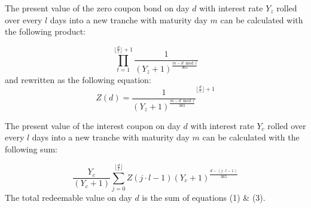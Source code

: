 \documentclass[10pt,oneside,reqno]{minimal}
\begin{document}
\begin{flushleft}
The present value of the zero coupon bond on day $d$ with interest rate $Y_{z}$ rolled over every $l$ days into a new tranche with maturity day $m$ can be calculated with the following product:
\end{flushleft}
  \begin{equation}
\prod_{t=1}^{\lfloor{\frac{d}{l}}\rfloor+1}\frac{1}{(Y_{z}+1)^{\frac{m-d\bmod l}{365}}}
  \end{equation}
and rewritten as the following equation:
  \begin{equation}
  Z\left(d\right)=\frac{1}{\left(Y_{z}+1\right)^{\frac{m- d\bmod l}{365}}}^{\lfloor{\frac{d}{l}}\rfloor+1}
  \end{equation}
\begin{flushleft}
The present value of the interest coupon on day $d$ with interest rate $Y_{c}$ rolled over every $l$ days into a new tranche with maturity day $m$ can be calculated with the following sum:
\end{flushleft}
  \begin{equation}
\frac{Y_{c}}{\left(Y_{c}+1\right)}\sum_{j=0}^{\lfloor{\frac{d}{l}}\rfloor}Z\left(j\cdot l-1\right)(Y_{c}+1)^{\frac{d-\left(j\cdot l-1\right)}{365}}
  \end{equation}
The total redeemable value on day $d$ is the sum of equations (1) \& (3).
\end{document}

